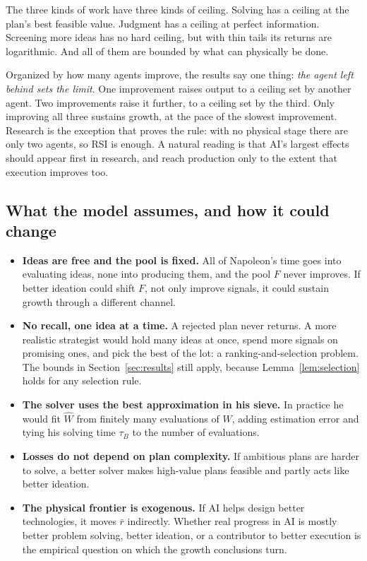 \documentclass[11pt]{article}
\newcommand{\Nap}{\textcolor{nap}{Napoleon}}
\theoremstyle{remark}
\begin{document}
The three kinds of work have three kinds of ceiling. Solving has a ceiling at the plan's best feasible value. Judgment has a ceiling at perfect information. Screening more ideas has no hard ceiling, but with thin tails its returns are logarithmic. And all of them are bounded by what can physically be done.

Organized by how many agents improve, the results say one thing: \emph{the agent left behind sets the limit}. One improvement raises output to a ceiling set by another agent. Two improvements raise it further, to a ceiling set by the third. Only improving all three sustains growth, at the pace of the slowest improvement. Research is the exception that proves the rule: with no physical stage there are only two agents, so RSI is enough. A natural reading is that AI's largest effects should appear first in research, and reach production only to the extent that execution improves too.

\subsection{What the model assumes, and how it could change}

\begin{itemize}
  \item \textbf{Ideas are free and the pool is fixed.} All of \Nap's time goes into evaluating ideas, none into producing them, and the pool $F$ never improves. If better ideation could shift $F$, not only improve signals, it could sustain growth through a different channel.
  \item \textbf{No recall, one idea at a time.} A rejected plan never returns. A more realistic strategist would hold many ideas at once, spend more signals on promising ones, and pick the best of the lot: a ranking-and-selection problem. The bounds in Section~\ref{sec:results} still apply, because Lemma~\ref{lem:selection} holds for any selection rule.
  \item \textbf{The solver uses the best approximation in his sieve.} In practice he would fit $\hat W$ from finitely many evaluations of $W$, adding estimation error and tying his solving time $\tau_B$ to the number of evaluations.
  \item \textbf{Losses do not depend on plan complexity.} If ambitious plans are harder to solve, a better solver makes high-value plans feasible and partly acts like better ideation.
  \item \textbf{The physical frontier is exogenous.} If AI helps design better technologies, it moves $\bar r$ indirectly. Whether real progress in AI is mostly better problem solving, better ideation, or a contributor to better execution is the empirical question on which the growth conclusions turn.
\end{itemize}
\end{document}
